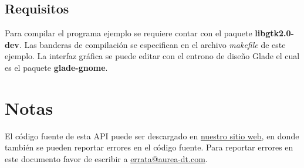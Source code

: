 \documentclass[a4paper,10pt]{article}
\begin{document}
  \subsection{Requisitos}
  Para compilar el programa ejemplo se requiere contar con el paquete \textbf{libgtk2.0-dev}. Las banderas de compilación se especifican en el archivo \textit{makefile} de este ejemplo. La interfaz gráfica se puede editar con el entrono de diseño Glade el cual es el paquete \textbf{glade-gnome}.

\section{Notas}
\label{notas}
El código fuente de esta API puede ser descargado en \href{http://www.aurea-dt.com/#rovioAPI}{nuestro sitio web}, en donde también se pueden reportar errores en el código fuente. Para reportar errores en este documento favor de escribir a \href{mailto:errata@aurea-dt.com}{errata@aurea-dt.com}.


% 
\end{document}
